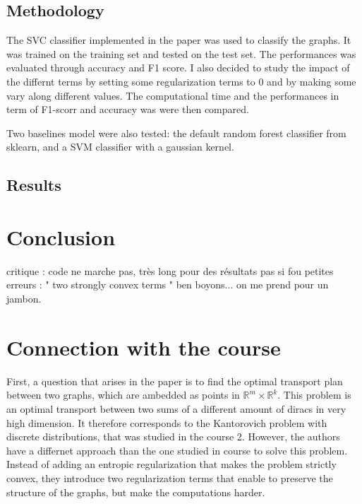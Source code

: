 \documentclass[a4paper,11pt]{article}
\begin{document}
\subsection{Methodology}

The SVC classifier implemented in the paper was used to classify the graphs. 
It was trained on the training set and tested on the test set.
The performances was evaluated through accuracy and F1 score.
I also decided to study the impact of the differnt terms by setting some regularization terms to 0 and by making some vary along different values. 
The computational time and the performances in term of F1-scorr and accuracy was were then compared. 

Two baselines model were also tested: the default random forest classifier from sklearn, and a SVM classifier with a gaussian kernel.





\subsection{Results}

\section{Conclusion}

critique : code ne marche pas, très long pour des résultats pas si fou 
petites erreurs : " two strongly convex terms " ben boyons... on me prend pour un jambon.

\section{Connection with the course}

First, a question that arises in the paper is to find the optimal transport plan between two graphs, which are ambedded as points in $\mathbb{R}^m \times \mathbb{R}^k$.
This problem is an optimal transport between two sums of a different amount of diracs in very high dimension. 
It therefore corresponds to the Kantorovich problem with discrete distributions, that was studied in the course 2. 
However, the authors have a differnet approach than the one studied in course to solve this problem. 
Instead of adding an entropic regularization that makes the problem strictly convex, they introduce two regularization terms that enable to preserve the structure of the graphs, but make the computations harder. 
\end{document}
